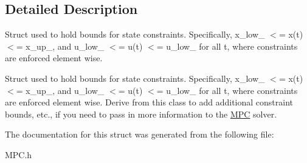 \subsection{Detailed Description}
Struct used to hold bounds for state constraints. Specifically, x\+\_\+low\+\_\+ $<$= x(t) $<$= x\+\_\+up\+\_\+, and u\+\_\+low\+\_\+ $<$= u(t) $<$= u\+\_\+low\+\_\+ for all t, where constraints are enforced element wise. 

Struct used to hold bounds for state constraints. Specifically, x\+\_\+low\+\_\+ $<$= x(t) $<$= x\+\_\+up\+\_\+, and u\+\_\+low\+\_\+ $<$= u(t) $<$= u\+\_\+low\+\_\+ for all t, where constraints are enforced element wise. Derive from this class to add additional constraint bounds, etc., if you need to pass in more information to the \mbox{\hyperlink{classMPC}{M\+PC}} solver. 

The documentation for this struct was generated from the following file\+:\begin{DoxyCompactItemize}
\item 
M\+P\+C.\+h\end{DoxyCompactItemize}
